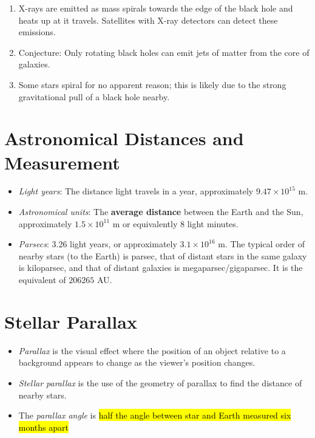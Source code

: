 \documentclass[a4paper,12pt]{article}
\let\oldsection\section
\renewcommand\section{\clearpage\oldsection}
\begin{document}
\begin{enumerate}
  \item X-rays are emitted as mass spirals towards the edge of the black hole and heats up at it travels. Satellites with X-ray detectors can detect these emissions.
  \item Conjecture: Only rotating black holes can emit jets of matter from the core of galaxies.
  \item Some stars spiral for no apparent reason; this is likely due to the strong gravitational pull of a black hole nearby.
\end{enumerate}

\section{Astronomical Distances and Measurement}

\begin{itemize}
  \item \textit{Light years}: The distance light travels in a year, approximately $9.47\times 10^{15}$ m.
  \item \textit{Astronomical units}: The \textbf{average distance} between the Earth and the Sun, approximately $1.5\times 10^{11}$ m or equivalently 8 light minutes.
  \item \textit{Parsecs}: 3.26 light years, or approximately $3.1\times 10^{16}$ m. The typical order of nearby stars (to the Earth) is parsec, that of distant stars in the same galaxy is kiloparsec, and that of distant galaxies is megaparsec/gigaparsec. It is the equivalent of $206265$ AU.
\end{itemize}

\section{Stellar Parallax}

\begin{itemize}
  \item \textit{Parallax} is the visual effect where the position of an object relative to a background appears to change as the viewer's position changes.
  \item \textit{Stellar parallax} is the use of the geometry of parallax to find the distance of nearby stars.
  \item The \textit{parallax angle} is \hl{half the angle between star and Earth measured six months apart}
\end{itemize}
\end{document}

